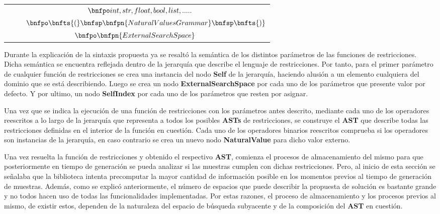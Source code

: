 \begin{longtable}{  c  }
    $\hspace{0.3cm}\bnfpo int, str, float, bool, list, .....$                                                                    \\
    $\hspace{0.9cm}\bnfpo \bnfts{(} \bnfsp \bnfpn{NaturalValuesGrammar}\bnfsp \bnfts{)}$                                         \\
    $\hspace{-0.2cm}\bnfpo \bnfpn{ExternalSearchSpace}$
    \\
\end{longtable}

Durante la explicación de la sintaxis propuesta ya se resaltó la semántica de los distintos parámetros de las
funciones de restricciones. Dicha semántica se encuentra reflejada dentro de la jerarquía que describe el
lenguaje de restricciones. Por tanto, para el primer parámetro de cualquier
función de restricciones se crea una instancia del nodo {\bf Self} de la jerarquía, haciendo alusión a un elemento
cualquiera del dominio que se está describiendo. Luego se crea un nodo {\bf ExternalSearchSpace} por cada uno de los
parámetros que presente valor por defecto. Y por ultimo, un nodo {\bf SelfIndex} por cada uno de los parámetros que
resten por asignar.

Una vez que se indica la ejecución de una función de restricciones con los parámetros antes descrito, mediante
cada uno de los operadores reescritos a lo largo de la jerarquía que representa a todos los posibles {\bf ASTs} de
restricciones, se construye el {\bf AST} que describe todas las restricciones definidas en el interior de la función
en cuestión. Cada uno de los operadores binarios reescritos comprueba si los operadores son instancias de la
jerarquía, en caso contrario se crea un nuevo nodo {\bf NaturalValue} para dicho valor externo.

Una vez resuelta la función de restricciones y obtenido el respectivo {\bf AST}, comienza el procesos de almacenamiento
del mismo para que posteriormente en tiempo de generación se pueda analizar si las muestras cumplen con dichas
restricciones. Pero, al inicio de esta sección se señalaba que la biblioteca intenta precomputar la mayor
cantidad de información posible en los momentos previos al tiempo de generación de muestras. Además, como
se explicó anteriormente, el número de espacios que puede describir la propuesta de solución es bastante
grande y no todos hacen uso de todas las funcionalidades implementadas. Por estas razones, el proceso de
almacenamiento y los procesos previos al mismo, de existir estos, dependen de la naturaleza del espacio de búsqueda
subyacente y de la composición del {\bf AST} en cuestión.

